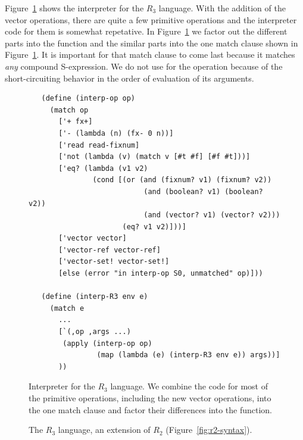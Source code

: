 \documentclass[11pt]{book}
\begin{document}
Figure~\ref{fig:interp-R3} shows the interpreter for the $R_3$
language. With the addition of the vector operations, there are quite
a few primitive operations and the interpreter code for them is
somewhat repetative. In Figure~\ref{fig:interp-R3} we factor out the
different parts into the  function and the similar
parts into the one match clause shown in
Figure~\ref{fig:interp-R3}. It is important for that match clause to
come last because it matches \emph{any} compound S-expression.  We do
not use  for the  operation because of the
short-circuiting behavior in the order of evaluation of its arguments.

\begin{figure}[tbp]
\begin{lstlisting}
   (define (interp-op op)
     (match op
       ['+ fx+]
       ['- (lambda (n) (fx- 0 n))]
       ['read read-fixnum]
       ['not (lambda (v) (match v [#t #f] [#f #t]))]
       ['eq? (lambda (v1 v2)
               (cond [(or (and (fixnum? v1) (fixnum? v2)) 
                           (and (boolean? v1) (boolean? v2))
                           (and (vector? v1) (vector? v2)))
                      (eq? v1 v2)]))]
       ['vector vector]
       ['vector-ref vector-ref]
       ['vector-set! vector-set!]
       [else (error "in interp-op S0, unmatched" op)]))

   (define (interp-R3 env e)
     (match e
       ...
       [`(,op ,args ...)
        (apply (interp-op op)
                (map (lambda (e) (interp-R3 env e)) args))]
       ))
\end{lstlisting}
\caption{Interpreter for the $R_3$ language. We combine the code for
  most of the primitive operations, including the new vector
  operations, into the one match clause and factor their differences
  into the  function. }
\label{fig:interp-R3}
\end{figure}

\begin{figure}[tbp]
\centering
{}
\caption{The $R_3$ language, an extension of $R_2$
  (Figure~\ref{fig:r2-syntax}).}
\label{fig:r3-syntax}
\end{figure}
\end{document}
